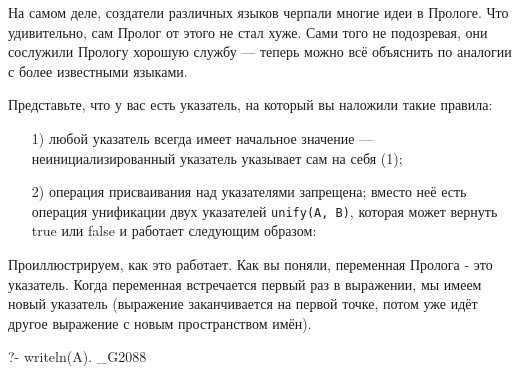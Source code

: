 \documentclass[a4paper]{book}
\begin{document}
На самом деле, создатели различных языков черпали многие идеи в
Прологе. Что удивительно, сам Пролог от этого не стал хуже. Сами
того не подозревая, они сослужили Прологу хорошую службу ---
теперь можно всё объяснить по аналогии с более известными языками.

Представьте, что у вас есть указатель, на который вы наложили
такие правила:

\label{unify_rules}
\begin{itemize}
\item[1)] любой указатель всегда имеет начальное значение ---
  неинициализированный указатель указывает сам на себя (1);
\item[2)] операция присваивания над указателями запрещена; вместо
  неё есть операция унификации двух указателей
  \verb|unify(A, B)|, которая может вернуть true или false и
  работает следующим образом:
\end{itemize}

Проиллюстрируем, как это работает. Как вы поняли, переменная
Пролога - это указатель. Когда переменная встречается первый раз
в выражении, мы имеем новый указатель (выражение заканчивается на
первой точке, потом уже идёт другое выражение с новым
пространством имён).

\begin{example}{}{}
?- writeln(A).
_G2088
\end{example}
\end{document}
